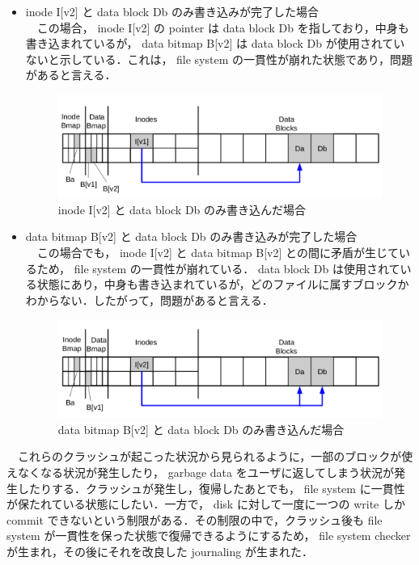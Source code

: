 \documentclass[graduation-thesis]{jsarticle}
\begin{document}
\begin{itemize}
\begin{figure}[H]
\begin{center}
	\end{center}
\end{figure}
	\item{inode I[v2] と data block Db のみ書き込みが完了した場合}\\
　この場合， inode I[v2] の pointer は data block Db を指しており，中身も書き込まれているが， data bitmap B[v2] は data block Db が使用されていないと示している．これは， file system の一貫性が崩れた状態であり，問題があると言える．\\ 
\begin{figure}[H]
	\begin{center}
		\includegraphics[width=15.0cm,clip]{images/data7.pdf}
		\caption{inode I[v2] と data block Db のみ書き込んだ場合}
		\label{fig:data7}
	\end{center}
\end{figure}
	\item{data bitmap B[v2] と data block Db のみ書き込みが完了した場合}\\
　この場合でも， inode I[v2] と data bitmap B[v2] との間に矛盾が生じているため， file system の一貫性が崩れている．	data block Db は使用されている状態にあり，中身も書き込まれているが，どのファイルに属すブロックかわからない．したがって，問題があると言える．\\
\begin{figure}[H]
	\begin{center}
		\includegraphics[width=15.0cm,clip]{images/data8.pdf}
		\caption{data bitmap B[v2] と data block Db のみ書き込んだ場合}
		\label{fig:data8}
	\end{center}
\end{figure}
\end{itemize}
　これらのクラッシュが起こった状況から見られるように，一部のブロックが使えなくなる状況が発生したり， garbage data をユーザに返してしまう状況が発生したりする．クラッシュが発生し，復帰したあとでも， file system に一貫性が保たれている状態にしたい．一方で， disk に対して一度に一つの write しか commit できないという制限がある．その制限の中で，クラッシュ後も file system が一貫性を保った状態で復帰できるようにするため， file system checker が生まれ，その後にそれを改良した journaling が生まれた．\\
\end{document}
